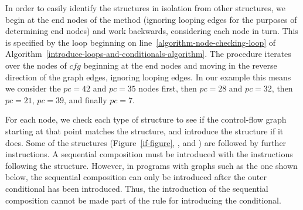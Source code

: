 In order to easily identify the structures in isolation from other
structures, we begin at the end nodes of the method (ignoring looping
edges for the purposes of determining end nodes) and work backwards,
considering each node in turn.
This is specified by the loop beginning on
line~\ref{algorithm-node-checking-loop} of
Algorithm~\ref{introduce-loops-and-conditionals-algorithm}.
The procedure  iterates over the nodes of
$cfg$ beginning at the end nodes and moving in the reverse direction
of the graph edges, ignoring looping edges.
In our example this means we consider the $pc=42$ and $pc=35$ nodes
first, then $pc=28$ and $pc=32$, then $pc=21$, $pc=39$, and finally
$pc=7$.

For each node, we check each type of structure to see if the
control-flow graph starting at that point matches the structure, and
introduce the structure if it does.
Some of the structures (Figure~\ref{if-figure},
,  and
) are followed by further instructions.
A sequential composition must be introduced with the instructions
following the structure.
However, in programs with graphs such as the one shown below, the
sequential composition can only be introduced after the outer
conditional has been introduced.
Thus, the introduction of the sequential composition cannot be made
part of the rule for introducing the conditional.
\begin{center}
\end{center}

